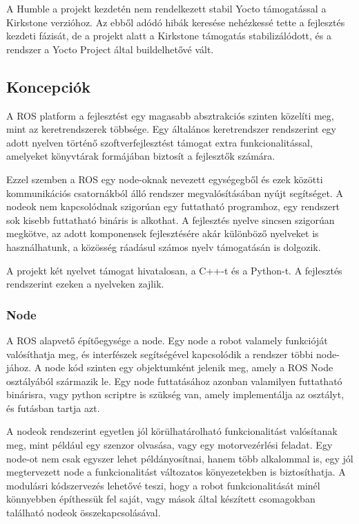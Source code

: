 A Humble a projekt kezdetén nem rendelkezett stabil Yocto támogatással a
Kirkstone verzióhoz. Az ebből adódó hibák keresése nehézkessé tette a fejlesztés
kezdeti fázisát, de a projekt alatt a Kirkstone támogatás stabilizálódott, és a
rendszer a Yocto Project által buildelhetővé vált.

\subsection{Koncepciók}

A ROS platform a fejlesztést egy magasabb absztrakciós szinten közelíti meg, mint
az keretrendszerek többsége. Egy általános keretrendszer rendszerint egy adott
nyelven történő szoftverfejlesztést támogat extra funkcionalitással, amelyeket
könyvtárak formájában biztosít a fejlesztők számára.

Ezzel szemben a ROS egy node-oknak nevezett egységegből és ezek közötti
kommunikációs csatornákból álló rendszer megvalósításában nyújt segítséget. A
nodeok nem kapcsolódnak szigorúan egy futtatható programhoz, egy rendszert sok
kisebb futtatható bináris is alkothat. A fejlesztés nyelve sincsen szigorúan
megkötve, az adott komponensek fejlesztésére akár különböző nyelveket is
használhatunk, a közösség ráadásul számos nyelv támogatásán is dolgozik.

A projekt két nyelvet támogat hivatalosan, a C++-t és a Python-t. A fejlesztés
rendszerint ezeken a nyelveken zajlik.

\subsubsection{Node}

A ROS alapvető építőegysége a node. Egy node a robot valamely funkcióját
valósíthatja meg, és interfészek segítségével kapcsolódik a rendszer többi
node-jához. A node kód szinten egy objektumként jelenik meg, amely a ROS Node
osztályából származik le. Egy node futtatásához azonban valamilyen futtatható
binárisra, vagy python scriptre is szükség van, amely implementálja az osztályt,
és futásban tartja azt.

A nodeok rendszerint egyetlen jól körülhatárolható funkcionalitást valósítanak
meg, mint például egy szenzor olvasása, vagy egy motorvezérlési feladat. Egy
node-ot nem csak egyszer lehet példányosítnai, hanem több alkalommal is, egy jól
megtervezett node a funkcionalitást változatos könyezetekben is biztosíthatja. A
modulásri kódszervezés lehetővé teszi, hogy a robot funkcionalitását minél
könnyebben építhessük fel saját, vagy mások által készített csomagokban található
nodeok összekapcsolásával.

